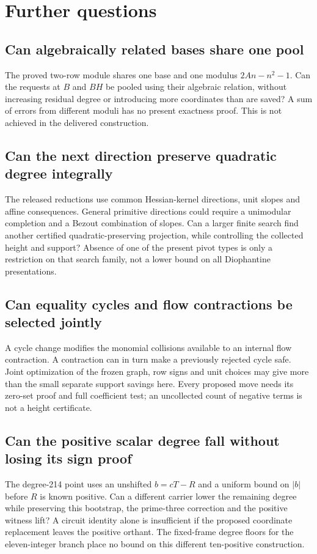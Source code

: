 \section{Further questions}
\subsection{Can algebraically related bases share one pool}
The proved two-row module shares one base and one modulus
$2An-n^2-1$. Can the requests at $B$ and $BH$ be pooled using their
algebraic relation, without increasing residual degree or introducing
more coordinates than are saved? A sum of errors from different moduli
has no present exactness proof. This is not achieved in the delivered
construction.

\subsection{Can the next direction preserve quadratic degree integrally}
The released reductions use common Hessian-kernel directions, unit slopes
and affine consequences. General primitive directions could require a
unimodular completion and a Bezout combination of slopes. Can a larger
finite search find another certified quadratic-preserving projection,
while controlling the collected height and support? Absence of one of
the present pivot types is only a restriction on that search family,
not a lower bound on all Diophantine presentations.

\subsection{Can equality cycles and flow contractions be selected jointly}
A cycle change modifies the monomial collisions available to an internal
flow contraction. A contraction can in turn make a previously rejected
cycle safe. Joint optimization of the frozen graph, row signs and unit
choices may give more than the small separate support savings here.
Every proposed move needs its zero-set proof and full coefficient test;
an uncollected count of negative terms is not a height certificate.

\subsection{Can the positive scalar degree fall without losing its sign proof}
The degree-214 point uses an unshifted $b=cT-R$ and a uniform bound on
$|b|$ before $R$ is known positive. Can a different carrier lower the
remaining degree while preserving this bootstrap, the prime-three
correction and the positive witness lift? A circuit identity alone is
insufficient if the proposed coordinate replacement leaves the positive
orthant. The fixed-frame degree floors for the eleven-integer branch
place no bound on this different ten-positive construction.

